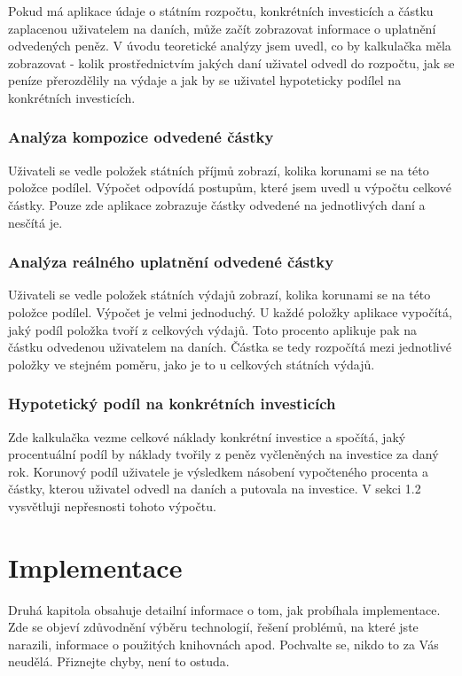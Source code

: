 \documentclass[11pt,a4paper,twoside,openright]{report}
\begin{document}
Pokud má aplikace údaje o státním rozpočtu, konkrétních investicích a částku zaplacenou uživatelem na daních, může začít zobrazovat informace o uplatnění odvedených peněz. V úvodu teoretické analýzy jsem uvedl, co by kalkulačka měla zobrazovat - kolik prostřednictvím jakých daní uživatel odvedl do rozpočtu, jak se peníze přerozdělily na výdaje a jak by se uživatel hypoteticky podílel na konkrétních investicích.

\subsection{Analýza kompozice odvedené částky}

Uživateli se vedle položek státních příjmů zobrazí, kolika korunami se na této položce podílel. Výpočet odpovídá postupům, které jsem uvedl u výpočtu celkové částky. Pouze zde aplikace zobrazuje částky odvedené na jednotlivých daní a nesčítá je.

\subsection{Analýza reálného uplatnění odvedené částky}

Uživateli se vedle položek státních výdajů zobrazí, kolika korunami se na této položce podílel. Výpočet je velmi jednoduchý. U každé položky aplikace vypočítá, jaký podíl položka tvoří z celkových výdajů. Toto procento aplikuje pak na částku odvedenou uživatelem na daních. Částka se tedy rozpočítá mezi jednotlivé položky ve stejném poměru, jako je to u celkových státních výdajů.

\subsection{Hypotetický podíl na konkrétních investicích}

Zde kalkulačka vezme celkové náklady konkrétní investice a spočítá, jaký procentuální podíl by náklady tvořily z peněz vyčleněných na investice za daný rok. Korunový podíl uživatele je výsledkem násobení vypočteného procenta a částky, kterou uživatel odvedl na daních a putovala na investice. V sekci 1.2 vysvětluji nepřesnosti tohoto výpočtu.

\chapter{Implementace}

Druhá kapitola obsahuje detailní informace o tom, jak probíhala implementace. Zde se objeví zdůvodnění výběru technologií, řešení problémů, na které jste narazili, informace o použitých knihovnách apod. Pochvalte se, nikdo to za Vás neudělá. Přiznejte chyby, není to ostuda.
\end{document}
